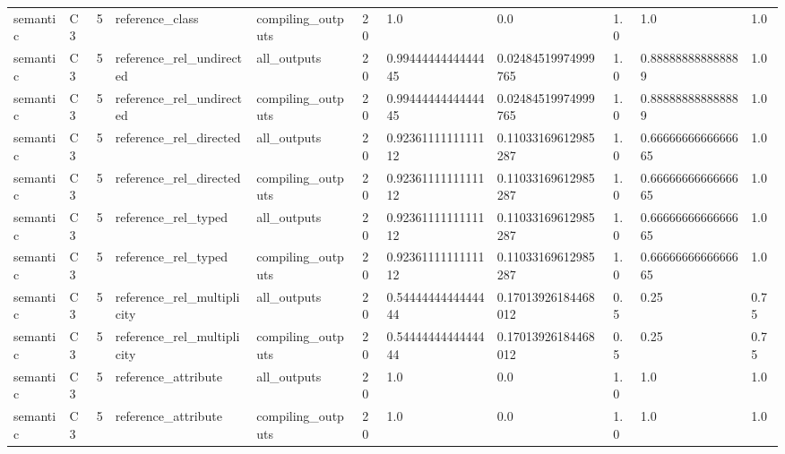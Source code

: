 \begin{tabular}{lllllllllll}
semantic & C3 & 5 & reference\_class & compiling\_outputs & 20 & 1.0 & 0.0 & 1.0 & 1.0 & 1.0 \\
semantic & C3 & 5 & reference\_rel\_undirected & all\_outputs & 20 & 0.9944444444444445 & 0.02484519974999765 & 1.0 & 0.888888888888889 & 1.0 \\
semantic & C3 & 5 & reference\_rel\_undirected & compiling\_outputs & 20 & 0.9944444444444445 & 0.02484519974999765 & 1.0 & 0.888888888888889 & 1.0 \\
semantic & C3 & 5 & reference\_rel\_directed & all\_outputs & 20 & 0.9236111111111112 & 0.11033169612985287 & 1.0 & 0.6666666666666665 & 1.0 \\
semantic & C3 & 5 & reference\_rel\_directed & compiling\_outputs & 20 & 0.9236111111111112 & 0.11033169612985287 & 1.0 & 0.6666666666666665 & 1.0 \\
semantic & C3 & 5 & reference\_rel\_typed & all\_outputs & 20 & 0.9236111111111112 & 0.11033169612985287 & 1.0 & 0.6666666666666665 & 1.0 \\
semantic & C3 & 5 & reference\_rel\_typed & compiling\_outputs & 20 & 0.9236111111111112 & 0.11033169612985287 & 1.0 & 0.6666666666666665 & 1.0 \\
semantic & C3 & 5 & reference\_rel\_multiplicity & all\_outputs & 20 & 0.5444444444444444 & 0.17013926184468012 & 0.5 & 0.25 & 0.75 \\
semantic & C3 & 5 & reference\_rel\_multiplicity & compiling\_outputs & 20 & 0.5444444444444444 & 0.17013926184468012 & 0.5 & 0.25 & 0.75 \\
semantic & C3 & 5 & reference\_attribute & all\_outputs & 20 & 1.0 & 0.0 & 1.0 & 1.0 & 1.0 \\
semantic & C3 & 5 & reference\_attribute & compiling\_outputs & 20 & 1.0 & 0.0 & 1.0 & 1.0 & 1.0 \\
\end{tabular}